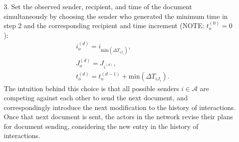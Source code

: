 \begin{itemize}
	 	 \item[3.] Set the observed sender, recipient, and time of the document simultaneously by choosing the sender who generated the minimum time in step 2 and the corresponding recipient and time increment (NOTE: $t_o^{(0)}=0$):
	 	 \begin{equation}
	 	 \begin{aligned}
	 	  &i_o^{(d)} = i_{\mbox{min}(\Delta T_{i{J_i}})}, \\
	 	  &J_o^{(d)} = J_{i^{(d)}},\\
	 	  	 &t_o^{(d)} = t_o^{(d-1)}+\mbox{min}(\Delta T_{i{J_i}}).
	 	  \end{aligned}
	 	 \end{equation}
	 	 The intuition behind this choice is that all possible senders $i \in \mathcal{A}$ are competing against each other to send the next document, and correspondingly introduce the next modification to the history of interactions. Once that next document is sent, the actors in the network revise their plans for document sending, considering the new entry in the history of interactions.
\end{itemize}

